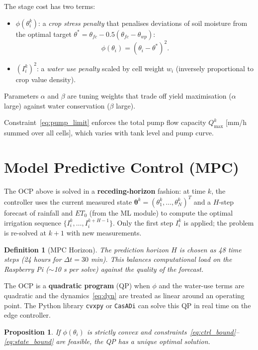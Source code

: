 \documentclass[12pt, a4paper]{report}
\newtheorem{proposition}[theorem]{Proposition}
\newtheorem{definition}{Definition}[chapter]
\begin{document}
\noindent The stage cost has two terms:
\begin{itemize}[leftmargin=2em]
  \item $\phi(\theta_i^k)$: a \textit{crop stress penalty} that penalises deviations of soil moisture from the optimal target $\theta^* = \theta_{fc} - 0.5(\theta_{fc}-\theta_{wp})$:
    \begin{equation}
      \phi(\theta_i) = \left(\theta_i - \theta^*\right)^2.
    \end{equation}
  \item $(I_i^k)^2$: a \textit{water use penalty} scaled by cell weight $w_i$ (inversely proportional to crop value density).
\end{itemize}

Parameters $\alpha$ and $\beta$ are tuning weights that trade off yield maximisation ($\alpha$ large) against water conservation ($\beta$ large).

Constraint~\eqref{eq:pump_limit} enforces the total pump flow capacity $Q_{\max}^k$ [mm/h summed over all cells], which varies with tank level and pump curve.

\section{Model Predictive Control (MPC)}

The OCP above is solved in a \textbf{receding-horizon} fashion: at time $k$, the controller uses the current measured state $\bm{\theta}^k = (\theta_1^k,\ldots,\theta_N^k)^T$ and a $H$-step forecast of rainfall and $ET_0$ (from the ML module) to compute the optimal irrigation sequence $\{I_i^{k}, \ldots, I_i^{k+H-1}\}$. Only the first step $I_i^k$ is applied; the problem is re-solved at $k+1$ with new measurements.

\begin{definition}[MPC Horizon]
The prediction horizon $H$ is chosen as 48 time steps (24 hours for $\Delta t = 30$ min). This balances computational load on the Raspberry Pi ($\sim$10 s per solve) against the quality of the forecast.
\end{definition}

The OCP is a \textbf{quadratic program} (QP) when $\phi$ and the water-use terms are quadratic and the dynamics~\eqref{eq:dyn} are treated as linear around an operating point. The Python library \texttt{cvxpy} or \texttt{CasADi} can solve this QP in real time on the edge controller.

\begin{proposition}
If $\phi(\theta_i)$ is strictly convex and constraints~\eqref{eq:ctrl_bound}–\eqref{eq:state_bound} are feasible, the QP has a unique optimal solution.
\end{proposition}
\end{document}
